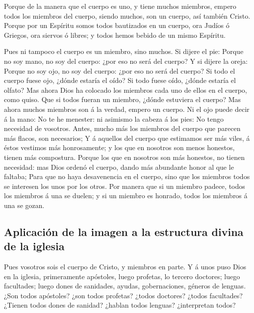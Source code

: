  Porque de la manera que el cuerpo es uno, y tiene muchos
miembros, empero todos los miembros del cuerpo, siendo muchos, son un
cuerpo, así también Cristo.  Porque por un Espíritu somos
todos bautizados en un cuerpo, ora Judíos ó Griegos, ora siervos ó
libres; y todos hemos bebido de un mismo Espíritu.

 Pues ni tampoco el cuerpo es un miembro, sino muchos.
 Si dijere el pie: Porque no soy mano, no soy del cuerpo:
¿por eso no será del cuerpo?  Y si dijere la oreja:
Porque no soy ojo, no soy del cuerpo: ¿por eso no será del cuerpo?
 Si todo el cuerpo fuese ojo, ¿dónde estaría el oído? Si
todo fuese oído, ¿dónde estaría el olfato?  Mas ahora
Dios ha colocado los miembros cada uno de ellos en el cuerpo, como
quiso.  Que si todos fueran un miembro, ¿dónde estuviera
el cuerpo?  Mas ahora muchos miembros son á la verdad,
empero un cuerpo.  Ni el ojo puede decir á la mano: No te
he menester: ni asimismo la cabeza á los pies: No tengo necesidad de
vosotros.  Antes, mucho más los miembros del cuerpo que
parecen más flacos, son necesarios;  Y á aquellos del
cuerpo que estimamos ser más viles, á éstos vestimos más honrosamente; y
los que en nosotros son menos honestos, tienen más compostura.
 Porque los que en nosotros son más honestos, no tienen
necesidad: mas Dios ordenó el cuerpo, dando más abundante honor al que
le faltaba;  Para que no haya desavenencia en el cuerpo,
sino que los miembros todos se interesen los unos por los otros.
 Por manera que si un miembro padece, todos los miembros
á una se duelen; y si un miembro es honrado, todos los miembros á una se
gozan.

\hypertarget{aplicaciuxf3n-de-la-imagen-a-la-estructura-divina-de-la-iglesia}{%
\subsection{Aplicación de la imagen a la estructura divina de la
iglesia}\label{aplicaciuxf3n-de-la-imagen-a-la-estructura-divina-de-la-iglesia}}

 Pues vosotros sois el cuerpo de Cristo, y miembros en
parte.  Y á unos puso Dios en la iglesia, primeramente
apóstoles, luego profetas, lo tercero doctores; luego facultades; luego
dones de sanidades, ayudas, gobernaciones, géneros de lenguas.
 ¿Son todos apóstoles? ¿son todos profetas? ¿todos
doctores? ¿todos facultades?  ¿Tienen todos dones de
sanidad? ¿hablan todos lenguas? ¿interpretan todos?

